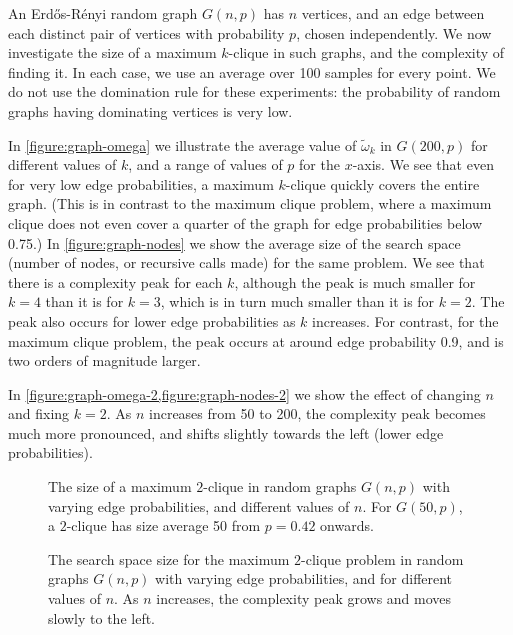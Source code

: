 \documentclass[letterpaper]{article}
\begin{document}
An Erd\H{o}s-R\'{e}nyi random graph $G(n, p)$ has $n$ vertices, and an edge between each distinct
pair of vertices with probability $p$, chosen independently. We now investigate the size of a
maximum $k$-clique in such graphs, and the complexity of finding it. In each case, we use an average
over 100 samples for every point.  We do not use the domination rule for these experiments: the
probability of random graphs having dominating vertices is very low.

In \cref{figure:graph-omega} we illustrate the average value of $\tilde{\omega}_k$ in $G(200,
p)$ for different values of $k$, and a range of values of $p$ for the $x$-axis. We see that even for
very low edge probabilities, a maximum $k$-clique quickly covers the entire graph.  (This is in contrast to
the maximum clique problem, where a maximum clique does not even cover a quarter of the graph for
edge probabilities below 0.75.) In \cref{figure:graph-nodes} we show the average size of the
search space (number of nodes, or recursive calls made) for the same problem. We see that there is a
complexity peak for each $k$, although the peak is much smaller for $k = 4$ than it is for $k = 3$,
which is in turn much smaller than it is for $k = 2$. The peak also occurs for lower edge
probabilities as $k$ increases. For contrast, for the maximum clique problem, the peak occurs at
around edge probability 0.9, and is two orders of magnitude larger.

In \cref{figure:graph-omega-2,figure:graph-nodes-2} we show the effect of
changing $n$ and fixing $k = 2$. As $n$ increases from 50 to 200, the complexity peak becomes much
more pronounced, and shifts slightly towards the left (lower edge probabilities).

\begin{figure}[t]
    \centering
    
    \caption{The size of a maximum $2$-clique in random graphs $G(n, p)$ with varying edge
        probabilities, and different values of $n$. For $G(50, p)$, a $2$-clique has size average 50
    from $p = 0.42$ onwards.}
    \label{figure:graph-omega-2}
\end{figure}

\begin{figure}[t]
    \centering
    
    \caption{The search space size for the maximum $2$-clique problem in random graphs $G(n, p)$
        with varying edge probabilities, and for different values of $n$. As $n$ increases, the
    complexity peak grows and moves slowly to the left.}
    \label{figure:graph-nodes-2}
\end{figure}
\end{document}
